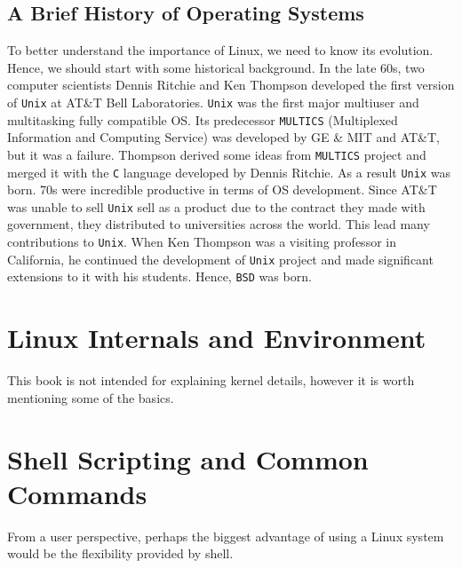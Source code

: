 \subsection{A Brief History of Operating Systems}
To better understand the importance of Linux, we need to know its evolution. Hence, we
should start with some historical background.
\newline \newline
In the late 60s, two computer scientists Dennis Ritchie and Ken Thompson developed the
first version of \texttt{Unix} at AT\&T Bell Laboratories. \texttt{Unix} was the first 
major multiuser and multitasking fully compatible OS. Its predecessor \texttt{MULTICS} 
(Multiplexed Information and Computing Service) was developed by GE \& MIT and AT\&T, 
but it was a failure. Thompson derived some ideas from \texttt{MULTICS} project and
merged it with the \texttt{C} language developed by Dennis Ritchie. As a result 
\texttt{Unix} was born. 
\newline \newline
70s were incredible productive in terms of OS development. Since AT\&T was unable to sell
\texttt{Unix} sell as a product due to the contract they made with government, they 
distributed to universities across the world. This lead many contributions to \texttt{Unix}.
When Ken Thompson was a visiting professor in California, he continued the development 
of \texttt{Unix} project and made significant extensions to it with his students. Hence,
\texttt{BSD} was born. 

\section{Linux Internals and Environment}
This book is not intended for explaining kernel details, however it is worth mentioning
some of the basics.


\section{Shell Scripting and Common Commands}
From a user perspective, perhaps the biggest advantage of using a Linux system would be
the flexibility provided by shell.
